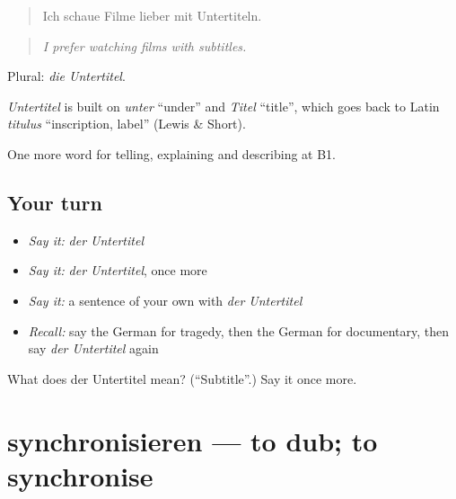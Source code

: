\begin{quote}
Ich schaue Filme lieber mit Untertiteln.
\end{quote}

\begin{quote}
\emph{I prefer watching films with subtitles.}
\end{quote}

Plural: \emph{die Untertitel}.

\begin{cousinweb}
\emph{Untertitel} is built on \emph{unter} \textquotedblleft{}under\textquotedblright{} and \emph{Titel} \textquotedblleft{}title\textquotedblright{}, which goes back to Latin \emph{titulus} \textquotedblleft{}inscription, label\textquotedblright{} (Lewis \& Short).
\end{cousinweb}

\begin{grammarlens}[title={What you've built}]
One more word for telling, explaining and describing at B1.
\end{grammarlens}

\subsection*{Your turn}
\begin{itemize}
\raggedright
  \item \emph{Say it:} \emph{der Untertitel}
  \item \emph{Say it:} \emph{der Untertitel}, once more
  \item \emph{Say it:} a sentence of your own with \emph{der Untertitel}
  \item \emph{Recall:} say the German for tragedy, then the German for documentary, then say \emph{der Untertitel} again
\end{itemize}

\begin{tcolorbox}[breakable,colback=teal!4,colframe=teal!35!black,title={Before you move on}]
What does der Untertitel mean? (\textquotedblleft{}Subtitle\textquotedblright{}.) Say it once more.
\end{tcolorbox}
\section[synchronisieren]{synchronisieren — to dub; to synchronise}

\label{lesson:GE-C524-synchronisieren}



